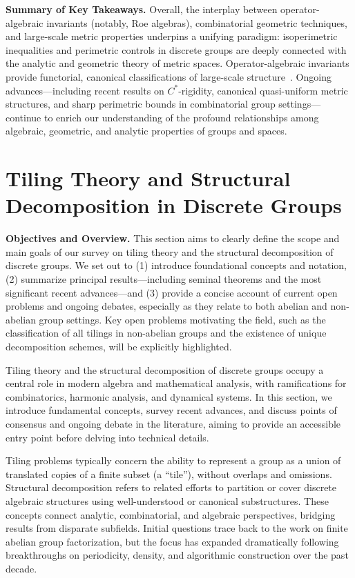\documentclass[sigconf]{acmart}
\begin{document}
\textbf{Summary of Key Takeaways.} Overall, the interplay between operator-algebraic invariants (notably, Roe algebras), combinatorial geometric techniques, and large-scale metric properties underpins a unifying paradigm: isoperimetric inequalities and perimetric controls in discrete groups are deeply connected with the analytic and geometric theory of metric spaces. Operator-algebraic invariants provide functorial, canonical classifications of large-scale structure~\cite{ref51,ref52,ref108}. Ongoing advances—including recent results on $C^*$-rigidity, canonical quasi-uniform metric structures, and sharp perimetric bounds in combinatorial group settings—continue to enrich our understanding of the profound relationships among algebraic, geometric, and analytic properties of groups and spaces.

\section{Tiling Theory and Structural Decomposition in Discrete Groups}

\textbf{Objectives and Overview.} This section aims to clearly define the scope and main goals of our survey on tiling theory and the structural decomposition of discrete groups. We set out to (1) introduce foundational concepts and notation, (2) summarize principal results—including seminal theorems and the most significant recent advances—and (3) provide a concise account of current open problems and ongoing debates, especially as they relate to both abelian and non-abelian group settings. Key open problems motivating the field, such as the classification of all tilings in non-abelian groups and the existence of unique decomposition schemes, will be explicitly highlighted.

Tiling theory and the structural decomposition of discrete groups occupy a central role in modern algebra and mathematical analysis, with ramifications for combinatorics, harmonic analysis, and dynamical systems. In this section, we introduce fundamental concepts, survey recent advances, and discuss points of consensus and ongoing debate in the literature, aiming to provide an accessible entry point before delving into technical details.

Tiling problems typically concern the ability to represent a group as a union of translated copies of a finite subset (a ``tile''), without overlaps and omissions. Structural decomposition refers to related efforts to partition or cover discrete algebraic structures using well-understood or canonical substructures. These concepts connect analytic, combinatorial, and algebraic perspectives, bridging results from disparate subfields. Initial questions trace back to the work on finite abelian group factorization, but the focus has expanded dramatically following breakthroughs on periodicity, density, and algorithmic construction over the past decade.
\end{document}
